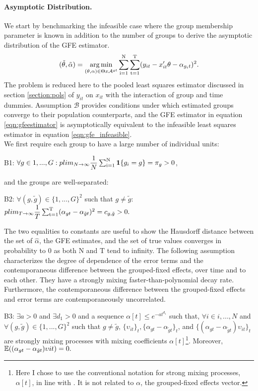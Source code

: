\paragraph{Asymptotic Distribution.} We start by benchmarking the infeasible case where the group membership parameter is known in addition to the number of groups to derive the asymptotic distribution of the GFE estimator. 
\begin{align}\label{eqn:gfe_infeasible}
    (\tilde{\theta}, \tilde{\alpha}) =  \operatorname*{arg\,min}_{(\theta, \alpha)\in \Theta x \mathcal{A}^{gt}} \operatorname*{\sum_{i=1}^N} \operatorname*{\sum_{t=1}^T} (y_{it} - x_{it}'\theta - \alpha_{g_{i}t})^2.
\end{align}
The problem is reduced here to the pooled least squares estimator discussed in section \ref{section:pols} of $y_{it}$ on $x_{it}$ with the interaction of group and time dummies. Assumption  $\mathcal{B}$ provides conditions under which estimated groups converge to their population counterparts, and the GFE estimator in equation \eqref{eqn:gfeestimator} is asymptotically equivalent to the infeasible least squares estimator in equation \eqref{eqn:gfe_infeasible}.\\
We first require each group to have a large number of individual units:
\begin{assumption} B1: $\forall g \in {1,...,G}: plim_{N \rightarrow \infty} \dfrac{1}{N} \operatorname*{\sum_{i=1}^N} \textbf{1} \{g_i = g\} =\pi_g > 0$,
\end{assumption}
and the groups are well-separated:
\begin{assumption} B2: $\forall (g,\tilde{g}) \in \{1,...,G\}^2$ such that $g \neq \tilde{g}$: $plim_{T \rightarrow \infty} \dfrac{1}{T} \operatorname*{\sum_{t=1}^T} (\alpha_{gt} - \alpha_{\tilde{g}t})^2 = c_{g, \tilde{g}} > 0. $
\end{assumption}
The two equalities to constants are useful to show the Hausdorff distance between the set of $\hat\alpha$, the GFE estimates, and the set of true values converges in probability to 0 as both N and T tend to infinity. 
The following assumption characterizes the degree of dependence of the error terms and the contemporaneous difference between the grouped-fixed effects, over time and to each other. They have a strongly mixing faster-than-polynomial decay rate. Furthermore, the contemporaneous difference between the grouped-fixed effects and error terms are contemporaneously uncorrelated.
\begin{assumption} B3: $\exists a>0$ and  $\exists d_1 > 0$ and a sequence $\alpha[t] \leq e^{-at^{d_1}}$ such that, $\forall i \in {i,...,N}$ and 
$\forall (g,\tilde{g}) \in \{1,...,G\}^2$ such that $g \neq \tilde{g}$, $\{\upsilon_{it}\}_t, \{\alpha_{gt} - \alpha_{\tilde{g}t}\}_t$, and $\{(\alpha_{gt} - \alpha_{\tilde{g}t})\upsilon_{it}\}_t$ are strongly mixing processes with mixing coefficients $\alpha[t]$\footnote{Here I chose to use the conventional notation for strong mixing processes, $\alpha[t]$, in line with \textcite{bonhomme2015grouped}. It is not related to $\alpha$, the grouped-fixed effects vector.}. Moreover, $\operatorname{\mathbb{E}}((\alpha_{gt} - \alpha_{\tilde{g}t})\upsilon{it}) = 0.$
\end{assumption} 

